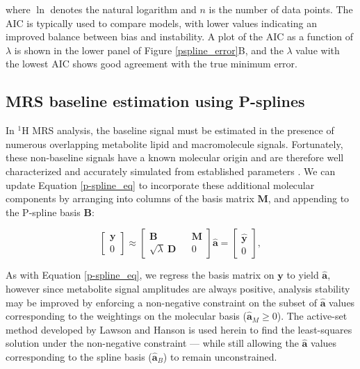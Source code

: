 \documentclass[num-refs]{wiley-article}
\begin{document}
where $\ln$ denotes the natural logarithm and $n$ is the number of data points. The AIC is typically used to compare models, with lower values indicating an improved balance between bias and instability. A plot of the AIC as a function of $\lambda$ is shown in the lower panel of Figure \ref{pspline_error}B, and the $\lambda$ value with the lowest AIC shows good agreement with the true minimum error.

\subsection{MRS baseline estimation using P-splines}

In $^1\mathrm{H}$ MRS analysis, the baseline signal must be estimated in the presence of numerous overlapping metabolite lipid and macromolecule signals. Fortunately, these non-baseline signals have a known molecular origin and are therefore well characterized and accurately simulated from established parameters \cite{Govind2015}. We can update Equation \ref{p-spline_eq} to incorporate these additional molecular components by arranging into columns of the basis matrix $\mathbf{M}$, and appending to the P-spline basis $\mathbf{B}$:

\begin{equation}
  \begin{bmatrix}
    \textbf{y} \\ 0
  \end{bmatrix}
  \approx
  \begin{bmatrix}
    \textbf{B} && \textbf{M} \\ \sqrt{\lambda} \ \textbf{D} && 0
  \end{bmatrix} \hat{\mathbf{a}} =
  \begin{bmatrix}
    \hat{\textbf{y}} \\ 0
  \end{bmatrix},
  \label{mrs_bl}
\end{equation}

As with Equation \ref{p-spline_eq}, we regress the basis matrix on $\mathbf{y}$ to yield $\hat{\mathbf{a}}$, however since metabolite signal amplitudes are always positive, analysis stability may be improved by enforcing a non-negative constraint on the subset of $\hat{\mathbf{a}}$ values corresponding to the weightings on the molecular basis ($\hat{\mathbf{a}}_{M} \geq 0$). The active-set method developed by Lawson and Hanson \cite{Lawson1995} is used herein to find the least-squares solution under the non-negative constraint --- while still allowing the $\hat{\mathbf{a}}$ values corresponding to the spline basis ($\hat{\mathbf{a}}_{B}$) to remain unconstrained.
\end{document}
